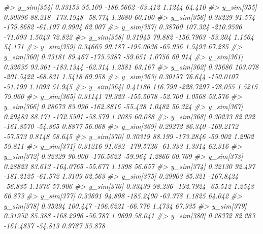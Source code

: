 \documentclass[
  10pt,
  italian,
  a4paper,
  extrafontsizes,onecolumn,openright
  ]{memoir}
\newenvironment{Shaded}{\begin{snugshade}}{\end{snugshade}}
\newcommand{\CommentTok}[1]{\textcolor[rgb]{0.56,0.35,0.01}{\textit{#1}}}
\begin{document}
\begin{Shaded}
\begin{Highlighting}[]
\CommentTok{\#\textgreater{}   y\_sim[354]  0.33153  95.109 {-}186.5662 {-}63.412  1.1244 64.410}
\CommentTok{\#\textgreater{}   y\_sim[355]  0.30396  88.218 {-}173.1948 {-}58.774  1.2680 60.100}
\CommentTok{\#\textgreater{}   y\_sim[356]  0.33229  91.574 {-}179.8682 {-}61.197  0.9904 62.007}
\CommentTok{\#\textgreater{}   y\_sim[357]  0.38760 107.324 {-}210.9596 {-}71.693  1.5043 72.822}
\CommentTok{\#\textgreater{}   y\_sim[358]  0.31945  79.882 {-}156.7963 {-}53.204  1.1564 54.171}
\CommentTok{\#\textgreater{}   y\_sim[359]  0.34665  99.187 {-}195.0636 {-}65.936  1.5493 67.285}
\CommentTok{\#\textgreater{}   y\_sim[360]  0.33181  89.467 {-}175.5387 {-}59.651  1.0756 60.914}
\CommentTok{\#\textgreater{}   y\_sim[361]  0.32635  93.361 {-}183.1344 {-}62.314  1.2581 63.167}
\CommentTok{\#\textgreater{}   y\_sim[362]  0.35686 103.078 {-}201.5422 {-}68.831  1.5418 69.958}
\CommentTok{\#\textgreater{}   y\_sim[363]  0.30157  76.644 {-}150.0107 {-}51.199  1.1093 51.945}
\CommentTok{\#\textgreater{}   y\_sim[364]  0.41186 116.799 {-}228.7297 {-}78.055  1.5215 79.060}
\CommentTok{\#\textgreater{}   y\_sim[365]  0.31141  79.323 {-}155.5078 {-}52.700  1.0568 53.576}
\CommentTok{\#\textgreater{}   y\_sim[366]  0.28673  83.096 {-}162.8816 {-}55.438  1.0482 56.324}
\CommentTok{\#\textgreater{}   y\_sim[367]  0.29483  88.171 {-}172.5501 {-}58.579  1.2085 60.088}
\CommentTok{\#\textgreater{}   y\_sim[368]  0.30233  82.292 {-}161.8570 {-}54.865  0.8877 56.068}
\CommentTok{\#\textgreater{}   y\_sim[369]  0.29272  86.340 {-}169.2172 {-}57.573  0.8148 58.645}
\CommentTok{\#\textgreater{}   y\_sim[370]  0.30319  88.199 {-}173.2846 {-}59.002  1.2902 59.811}
\CommentTok{\#\textgreater{}   y\_sim[371]  0.31216  91.682 {-}179.5726 {-}61.333  1.3314 62.316}
\CommentTok{\#\textgreater{}   y\_sim[372]  0.32329  90.000 {-}176.5622 {-}59.964  1.2866 60.769}
\CommentTok{\#\textgreater{}   y\_sim[373]  0.28823  83.613 {-}164.0765 {-}55.677  1.1398 56.657}
\CommentTok{\#\textgreater{}   y\_sim[374]  0.32130  92.497 {-}181.2125 {-}61.572  1.3109 62.563}
\CommentTok{\#\textgreater{}   y\_sim[375]  0.29903  85.321 {-}167.8424 {-}56.835  1.1376 57.906}
\CommentTok{\#\textgreater{}   y\_sim[376]  0.33439  98.236 {-}192.7924 {-}65.512  1.2543 66.873}
\CommentTok{\#\textgreater{}   y\_sim[377]  0.33691  94.898 {-}185.2400 {-}63.378  1.1825 64.042}
\CommentTok{\#\textgreater{}   y\_sim[378]  0.35294 100.447 {-}196.6221 {-}66.776  1.4734 67.935}
\CommentTok{\#\textgreater{}   y\_sim[379]  0.31952  85.388 {-}168.2996 {-}56.787  1.0699 58.041}
\CommentTok{\#\textgreater{}   y\_sim[380]  0.28372  82.283 {-}161.4857 {-}54.813  0.9787 55.878}

\end{Highlighting}
\end{Shaded}
\end{document}
